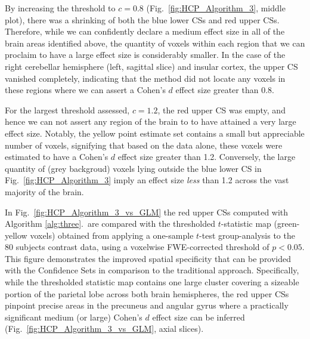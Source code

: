 By increasing the threshold to $c = 0.8$ (Fig.\ \ref{fig:HCP_Algorithm_3}, middle plot), there was a shrinking of both the blue lower CSs and red upper CSs. Therefore, while we can confidently declare a medium effect size in all of the brain areas identified above, the quantity of voxels within each region that we can proclaim to have a large effect size is considerably smaller. In the case of the right cerebellar hemisphere (left, sagittal slice) and insular cortex, the upper CS vanished completely, indicating that the method did not locate any voxels in these regions where we can assert a Cohen's $d$ effect size greater than 0.8.

For the largest threshold assessed, $c = 1.2$, the red upper CS was empty, and hence we can not assert any region of the brain to to have attained a very large effect size. Notably, the yellow point estimate set contains a small but appreciable number of voxels, signifying that based on the data alone, these voxels were estimated to have a Cohen's $d$ effect size greater than 1.2. Conversely, the large quantity of (grey backgroud) voxels lying outside the blue lower CS in Fig.\ \ref{fig:HCP_Algorithm_3} imply an effect size \textit{less} than 1.2 across the vast majority of the brain.

In Fig.\ \ref{fig:HCP_Algorithm_3_vs_GLM} the red upper CSs computed with Algorithm \ref{alg:three}.\ are compared with the thresholded $t$-statistic map (green-yellow voxels) obtained from applying a one-sample $t$-test group-analysis to the 80 subjects contrast data, using a voxelwise FWE-corrected threshold of $p < 0.05$. This figure demonstrates the improved spatial specificity that can be provided with the Confidence Sets in comparison to the traditional approach. Specifically, while the thresholded statistic map contains one large cluster covering a sizeable portion of the parietal lobe across both brain hemispheres, the red upper CSs pinpoint precise areas in the precuneus and angular gyrus where a practically significant medium (or large) Cohen's $d$ effect size can be inferred (Fig.\ \ref{fig:HCP_Algorithm_3_vs_GLM}, axial slices).

